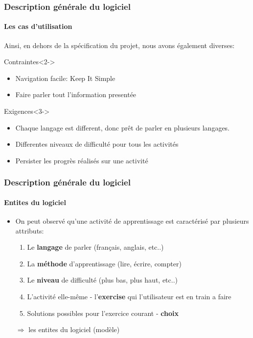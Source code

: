 \documentclass[15pt]{beamer}
\begin{document}
\begin{frame}
 \frametitle{Description g\'en\'erale du logiciel}
 \framesubtitle{Les cas d'utilisation}
  Ainsi, en dehors de la sp\'ecification du projet, nous avons \'egalement diverses:
  \begin{exampleblock}{Contraintes}<2->
   \begin{itemize}
    \item Navigation facile: \og Keep It Simple \fg{}
    \item Faire parler tout l'information present\'ee
   \end{itemize}
  \end{exampleblock}

  \begin{exampleblock}{Exigences}<3->
   \begin{itemize}
    \item Chaque langage est different, donc pr\^et de parler
    en plusieurs langages.
    \item Differentes niveaux de difficult\'e pour tous les activit\'es
    \item Persister les progr\`es r\'ealis\'es sur une activit\'e
   \end{itemize}
  \end{exampleblock}
\end{frame}

\begin{frame}
 \frametitle{Description g\'en\'erale du logiciel}
 \framesubtitle{Entites du logiciel}
  \begin{itemize}
    \item On peut observ\'e qu'une activit\'e de apprentissage est caract\'eris\'e par plusieurs attributs:
  \begin{enumerate}
   \item Le \textbf{langage} de parler (fran\c cais, anglais, etc..)
   \item La \textbf{m\'ethode} d'apprentissage (lire, \'ecrire, compter)
   \item Le \textbf{niveau} de difficult\'e (plus bas, plus haut, etc..)
   \item L'activit\'e elle-m\^eme - l'\textbf{exercise} qui l'utilisateur est en train a faire
   \item Solutions possibles pour l'exercice courant - \textbf{choix}
  \end{enumerate}
$\Rightarrow$ les entites du logiciel (mod\`ele)
  \end{itemize}
\end{frame}
\end{document}
